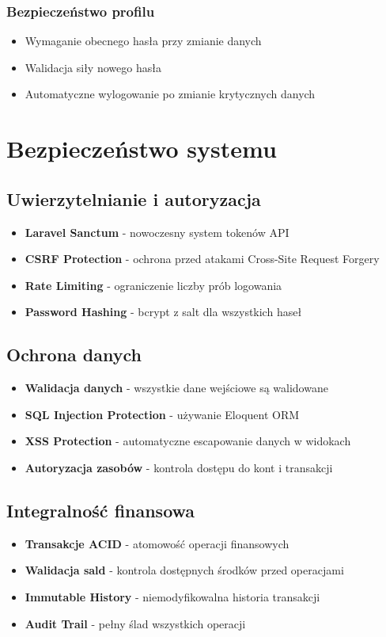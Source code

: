 \documentclass[12pt,a4paper]{article}
\begin{document}
    \subsubsection{Bezpieczeństwo profilu}
    \begin{itemize}
        \item Wymaganie obecnego hasła przy zmianie danych
        \item Walidacja siły nowego hasła
        \item Automatyczne wylogowanie po zmianie krytycznych danych
    \end{itemize}

    \section{Bezpieczeństwo systemu}

    \subsection{Uwierzytelnianie i autoryzacja}
    \begin{itemize}
        \item \textbf{Laravel Sanctum} - nowoczesny system tokenów API
        \item \textbf{CSRF Protection} - ochrona przed atakami Cross-Site Request Forgery
        \item \textbf{Rate Limiting} - ograniczenie liczby prób logowania
        \item \textbf{Password Hashing} - bcrypt z salt dla wszystkich haseł
    \end{itemize}

    \subsection{Ochrona danych}
    \begin{itemize}
        \item \textbf{Walidacja danych} - wszystkie dane wejściowe są walidowane
        \item \textbf{SQL Injection Protection} - używanie Eloquent ORM
        \item \textbf{XSS Protection} - automatyczne escapowanie danych w widokach
        \item \textbf{Autoryzacja zasobów} - kontrola dostępu do kont i transakcji
    \end{itemize}

    \subsection{Integralność finansowa}
    \begin{itemize}
        \item \textbf{Transakcje ACID} - atomowość operacji finansowych
        \item \textbf{Walidacja sald} - kontrola dostępnych środków przed operacjami
        \item \textbf{Immutable History} - niemodyfikowalna historia transakcji
        \item \textbf{Audit Trail} - pełny ślad wszystkich operacji
    \end{itemize}
\end{document}
